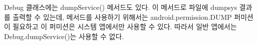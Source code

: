Debug 클래스에는 dumpService() 메서드도 있다. 
이 메서드로 파일에 dumpsys 결과를 출력할 수 있는데, 메서드를 사용하기 위해서는 android.permission.DUMP 퍼미션이 필요하고 이 퍼미션은 시스템 앱에서만 사용할 수 있다. 따라서 일반 앱에서는 Debug.dumpService()는 사용할 수 없다.


